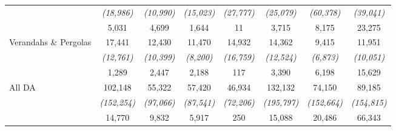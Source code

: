 \begin{table}[htbp]
{\begin{tabular}{rccccccc}
          & \textit{(18,986)} & \textit{(10,990)} & \textit{(15,023)} & \textit{(27,777)} & \textit{(25,079)} & \textit{(60,378)} & \textit{(39,041)} \\
          & 5,031 & 4,699 & 1,644 & 11    & 3,715 & 8,175 & 23,275 \\
    \multicolumn{1}{l}{Verandahs \& Pergolas} & 17,441 & 12,430 & 11,470 & 14,932 & 14,362 & 9,415 & 11,951 \\
          & \textit{(12,761)} & \textit{(10,399)} & \textit{(8,200)} & \textit{(16,759)} & \textit{(12,524)} & \textit{(6,873)} & \textit{(10,051)} \\
          & 1,289 & 2,447 & 2,188 & 117   & 3,390 & 6,198 & 15,629 \\
    \multicolumn{1}{l}{All DA} & 102,148 & 55,322 & 57,420 & 46,934 & 132,132 & 74,150 & 89,185 \\
          & \textit{(152,254)} & \textit{(97,066)} & \textit{(87,541)} & \textit{(72,206)} & \textit{(195,797)} & \textit{(152,664)} & \textit{(154,815)} \\
          & 14,770 & 9,832 & 5,917 & 250   & 15,088 & 20,486 & 66,343 \\
    \bottomrule
    \end{tabular}%
    }
  \label{tab:DA_statistics}%
\end{table}%
